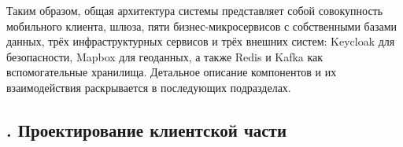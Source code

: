 {	\par \redline Таким образом, общая архитектура системы представляет собой совокупность мобильного клиента, шлюза, пяти бизнес-микросервисов с собственными базами данных, трёх инфраструктурных сервисов и трёх внешних систем: Keycloak для безопасности, Mapbox для геоданных, а также Redis и Kafka как вспомогательные хранилища. Детальное описание компонентов и их взаимодействия раскрывается в последующих подразделах.
	
	\par
}

\titlespace

\subsection*{ 
	\gostTitleFont
	\redline
	\thechaptercntr .\thesubchaptercntr \spc
	Проектирование клиентской части
} \addtocounter{subchaptercntr}{1}

\subtitlespace

